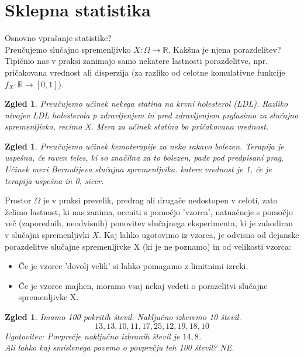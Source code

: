 \documentclass[11pt]{article}
\newtheorem{Zgled}[Izrek]{{\sc Zgled}}
\begin{document}
\section{Sklepna statistika}

Osnovno vprašanje statistike? 
\\
Preučujemo slučajno spremenljivko $X:\Omega \to \mathbb{R}$. Kakšna je njena porazdelitev?
\\
Tipičnio nas v praksi zanimajo samo nekatere lastnosti porazdelitve, npr. pričakovana vrednost ali disperzija (za razliko od celotne komulativne funkcije $f_X: \mathbb{R}\to [0 ,1] $).

\begin{Zgled}
	Preučujemo učinek nekega statina na krvni holesterol (LDL). Razliko nivojev LDL holesterola p zdravljenjem in pred zdravljenjem prglasimo za slučajno spremenljivko, recimo X. Mera za učinek statina bo pričakovana vrednost.
\end{Zgled} 
\begin{Zgled}
	Preučujemo učinek kemoterapije za neko rakavo bolezen. Terapija je uspešna, če raven teles, ki so značilna za to bolezen, pade pod predpisani prag. Učinek meri Bernulijeva slučajna spremenljvika. katere vrednost je 1, če je terapija uspešna in 0, sicer.
\end{Zgled}

Prostor $\Omega$ je v praksi prevelik, predrag ali drugače nedostopen v celoti, zato želimo lastnost, ki nas zanima, oceniti s pomočjo 'vzorca', natnačneje s pomočjo več (zaporednih, neodvisnih) ponovitev slučajnega eksperimenta, ki je zakodiran v slučajni spremenljivki $X$. Kaj lahko ugotovimo iz vzorca, je odvisno od dejanske porazdelitve slučajne spremenljivke X (ki je ne poznamo) in od velikosti vzorca:
\begin{itemize}
	\item 
	Če je vzorec 'dovolj velik' si lahko pomagamo z limitnimi izreki.
	\item
	Če je vzorec majhen, moramo vsaj nekaj vedeti o porazelitvi slučajne spremenljivke X.
\end{itemize}
\begin{Zgled}
	Imamo 100 pokritih števil. Naključno izberemo 10 števil. 
	$$ 13, 13, 10, 11, 17, 25, 12, 19, 18, 10$$
	Ugotovitev: Povprečje naključno izbranih števil je $14,8$.
	\\
	Ali lahko kaj smislenega povemo o povprečju teh 100 števil? NE.
\end{Zgled}
\end{document}
